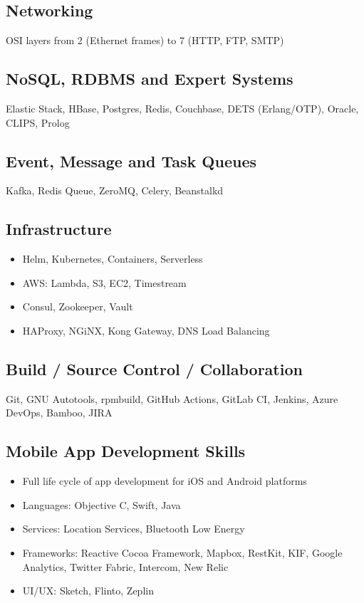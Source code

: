 \subsection*{Networking}
OSI layers from 2 (Ethernet frames) to 7 (HTTP, FTP, SMTP)

\subsection*{NoSQL, RDBMS and Expert Systems}
Elastic Stack, HBase, Postgres, Redis, Couchbase, DETS (Erlang/OTP), Oracle, CLIPS, Prolog

\subsection*{Event, Message and Task Queues}
Kafka, Redis Queue, ZeroMQ, Celery, Beanstalkd

\subsection*{Infrastructure}
\begin{itemize}[noitemsep, nosep]
  \item Helm, Kubernetes, Containers, Serverless
  \item AWS: Lambda, S3, EC2, Timestream
  \item Consul, Zookeeper, Vault
  \item HAProxy, NGiNX, Kong Gateway, DNS Load Balancing
\end{itemize}

\subsection*{Build / Source Control / Collaboration}
Git, GNU Autotools, rpmbuild, GitHub Actions, GitLab CI, Jenkins, Azure DevOps, Bamboo, JIRA

\subsection*{Mobile App Development Skills}
\begin{itemize}[noitemsep, nosep]
  \item Full life cycle of app development for iOS and Android platforms
  \item Languages: Objective C, Swift, Java
  \item Services: Location Services, Bluetooth Low Energy
  \item Frameworks: Reactive Cocoa Framework, Mapbox, RestKit, KIF, Google Analytics, Twitter Fabric, Intercom, New Relic
  \item UI/UX: Sketch, Flinto, Zeplin
\end{itemize}

